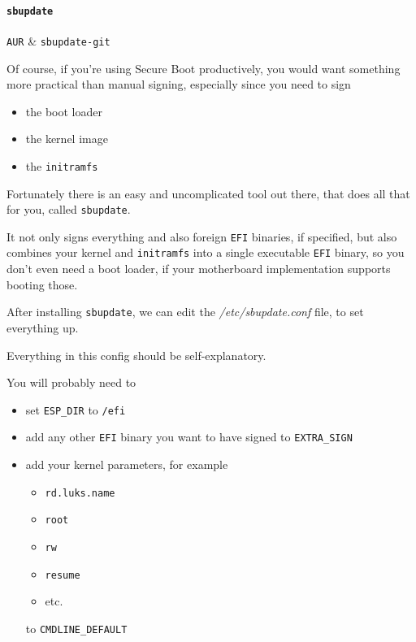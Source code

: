 \documentclass[10pt]{dustdoc}
\begin{document}
\paragraph{\texttt{sbupdate}}
\label{par:sbupdate}

\begin{packagetable}
    \texttt{AUR} & \texttt{sbupdate-git} \\
\end{packagetable}

Of course, if you’re using Secure Boot productively, you would want something more practical than manual signing, especially since you need to sign

\begin{itemize}
    \item the boot loader

    \item the kernel image

    \item the \texttt{initramfs}
\end{itemize}

Fortunately there is an easy and uncomplicated tool out there, that does all that for you, called \texttt{sbupdate}.

It not only signs everything and also foreign \texttt{EFI} binaries, if specified, but also combines your kernel and \texttt{initramfs} into a single executable \texttt{EFI} binary, so you don’t even need a boot loader, if your motherboard implementation supports booting those.

After installing \texttt{sbupdate}, we can edit the \textit{/etc/sbupdate.conf} file, to set everything up.

Everything in this config should be self-explanatory.

You will probably need to

\begin{itemize}
    \item set \texttt{ESP\_DIR} to \texttt{/efi}

    \item add any other \texttt{EFI} binary you want to have signed to \texttt{EXTRA\_SIGN}

    \item add your kernel parameters, for example

        \begin{itemize}
            \item \texttt{rd.luks.name}
            \item \texttt{root}
            \item \texttt{rw}
            \item \texttt{resume}
            \item etc.
        \end{itemize}

        \noindent
        to \texttt{CMDLINE\_DEFAULT}
\end{itemize}
\end{document}
